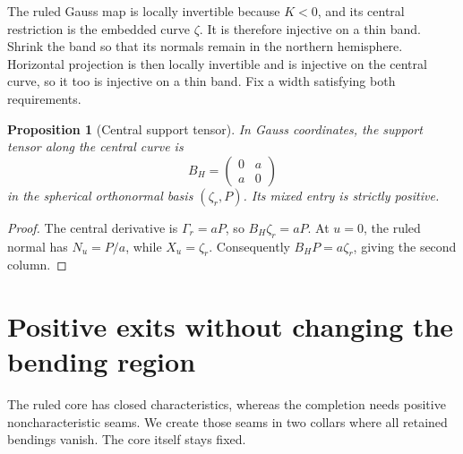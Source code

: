 \documentclass[11pt]{amsart}
\newtheorem{proposition}[theorem]{Proposition}
\theoremstyle{definition}
\theoremstyle{remark}
\numberwithin{equation}{section}
\begin{document}
The ruled Gauss map is locally invertible because $K<0$, and its central
restriction is the embedded curve $\zeta$. It is therefore injective on
a thin band. Shrink the band so that its normals remain in the northern
hemisphere. Horizontal projection is then locally invertible and is
injective on the central curve, so it too is injective on a thin band.
Fix a width satisfying both requirements.

\begin{proposition}[Central support tensor]\label{prop:central-support}
In Gauss coordinates, the support tensor along the central curve is
\begin{equation}\label{eq:central-B}
 B_H=\begin{pmatrix}0&a\\a&0\end{pmatrix}
\end{equation}
in the spherical orthonormal basis $(\zeta_r,P)$. Its mixed entry is
strictly positive.
\end{proposition}
\begin{proof}
The central derivative is $\Gamma_r=aP$, so $B_H\zeta_r=aP$.
At $u=0$, the ruled normal has $N_u=P/a$, while $X_u=\zeta_r$.
Consequently $B_HP=a\zeta_r$, giving the second column.
\end{proof}

\section{Positive exits without changing the bending region}\label{sec:exits}
The ruled core has closed characteristics, whereas the completion needs
positive noncharacteristic seams. We create those seams in two collars
where all retained bendings vanish. The core itself stays fixed.
\end{document}
